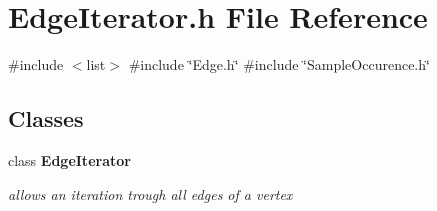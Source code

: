\section{Edge\+Iterator.\+h File Reference}
\label{EdgeIterator_8h}
{\ttfamily \#include $<$list$>$}\newline
{\ttfamily \#include \char`\"{}Edge.\+h\char`\"{}}\newline
{\ttfamily \#include \char`\"{}Sample\+Occurence.\+h\char`\"{}}\newline
\subsection*{Classes}
\begin{DoxyCompactItemize}
\item 
class \textbf{ Edge\+Iterator}
\begin{DoxyCompactList}\small\item\em allows an iteration trough all edges of a vertex \end{DoxyCompactList}\end{DoxyCompactItemize}
